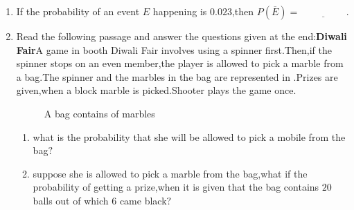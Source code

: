 \begin{enumerate}
\item If the probability of an event $E$ happening is $0.023$,then $P(\overline{E})=\underline{\hspace{2cm}}$.
\item Read the following passage and answer the questions given at the end:\newline\textbf{Diwali Fair}\newline A game in booth Diwali Fair involves using a spinner first.Then,if the spinner stops on an even member,the player is allowed to pick a marble from a bag.The spinner and the marbles in the bag are represented in .\newline Prizes are given,when a block marble is picked.Shooter plays the game once.
\begin{figure}[H]
\centering
\caption{A bag contains of marbles}
\label{fig:PROB.PNG}
\end{figure}
\begin{enumerate}[label=(\roman*)]
\item what is the probability that she will be allowed to pick a mobile from the bag$?$
\item suppose she is allowed to pick a marble from the bag,what if the probability of getting a prize,when it is given that the bag contains $20$ balls out of which $6$ came black$?$
\end{enumerate}
\end{enumerate}
